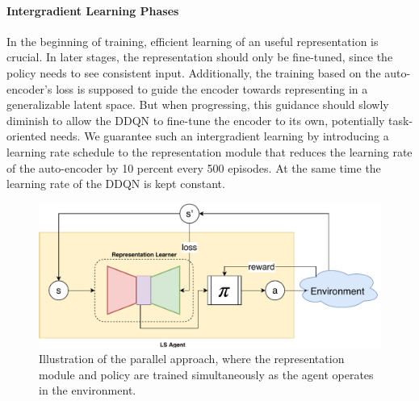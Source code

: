 \paragraph{Intergradient Learning Phases} In the beginning of training, efficient learning of an useful representation is crucial. In later stages, the representation should only be fine-tuned, since the policy needs to see consistent input. Additionally, the training based on the auto-encoder's loss is supposed to guide the encoder towards representing in a generalizable latent space. But when progressing, this guidance should slowly diminish to allow the DDQN to fine-tune the encoder to its own, potentially task-oriented needs. We guarantee such an intergradient learning by introducing a learning rate schedule to the representation module that reduces the learning rate of the auto-encoder by 10 percent every 500 episodes. At the same time the learning rate of the DDQN is kept constant.

\begin{figure}[ht!]
	\centering
	\includegraphics[width=\linewidth]{img/parallel.pdf}
	\caption{Illustration of the parallel approach, where the representation module and policy are trained simultaneously as the agent operates in the environment.\label{fig:approaches}}
\end{figure}

